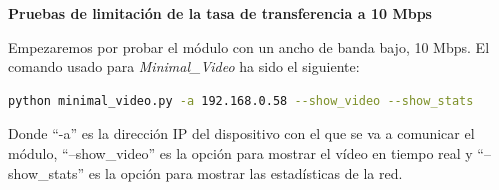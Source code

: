 \newpage

\textbf{Pruebas de limitación de la tasa de transferencia a 10 Mbps}
\vspace{\baselineskip}

Empezaremos por probar el módulo con un ancho de banda bajo, 10 Mbps. El comando usado para \textit{Minimal\_Video} ha sido el siguiente:

\begin{lstlisting}[language=bash]
python minimal_video.py -a 192.168.0.58 --show_video --show_stats
\end{lstlisting}
Donde ``-a'' es la dirección IP del dispositivo con el que se va a comunicar el módulo, ``--show\_video'' es la opción para mostrar el vídeo en tiempo real y ``--show\_stats'' es la opción para mostrar las estadísticas de la red.
\vspace{\baselineskip}

